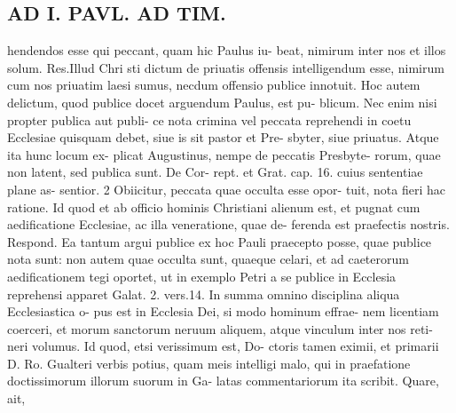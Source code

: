 \documentclass{article}
\begin{document}
\begin{pages}
\section*{AD I. PAVL. AD TIM. }
\marginpar{[ p.Jle ]}hendendos esse qui peccant, quam hic Paulus iu- beat, nimirum inter nos et illos solum. Res.Illud Chri sti dictum de priuatis offensis intelligendum esse, nimirum cum nos priuatim laesi sumus, necdum offensio publice innotuit. Hoc autem delictum, quod publice docet arguendum Paulus, est pu- blicum. Nec enim nisi propter publica aut publi- ce nota crimina vel peccata reprehendi in coetu Ecclesiae quisquam debet, siue is sit pastor et Pre- sbyter, siue priuatus. Atque ita hunc locum ex- plicat Augustinus, nempe de peccatis Presbyte- rorum, quae non latent, sed publica sunt. De Cor- rept. et Grat. cap. 16. cuius sententiae plane as- sentior. 2 Obiicitur, peccata quae occulta esse opor- tuit, nota fieri hac ratione. Id quod et ab officio hominis Christiani alienum est, et pugnat cum aedificatione Ecclesiae, ac illa veneratione, quae de- ferenda est praefectis nostris. Respond. Ea tantum argui publice ex hoc Pauli praecepto posse, quae publice nota sunt: non autem quae occulta sunt, quaeque celari, et ad caeterorum aedificationem tegi oportet, ut in exemplo Petri a se publice in Ecclesia reprehensi apparet Galat. 2. vers.14. In summa omnino disciplina aliqua Ecclesiastica o- pus est in Ecclesia Dei, si modo hominum effrae- nem licentiam coerceri, et morum sanctorum neruum aliquem, atque vinculum inter nos reti- neri volumus. Id quod, etsi verissimum est, Do- ctoris tamen eximii, et primarii D. Ro. Gualteri verbis potius, quam meis intelligi malo, qui in praefatione doctissimorum illorum suorum in Ga- latas commentariorum ita scribit. Quare, ait, 

\end{pages}
\end{document}
